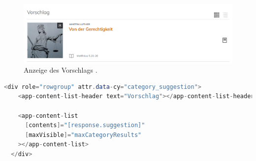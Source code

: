 \begin{figure}[h]
  \begin{centering}
    \includegraphics[width=\textwidth]{figures/development/suggestion.png}
    \caption{Anzeige des Vorschlags \cite{pfleiderer2022}.}
    \label{fig:suggestion}
  \end{centering}
\end{figure}


\begin{lstlisting}[language=Java, label=code:suggestionRow, title={Code für Anzeige des Vorschlage \cite{frontend2022}}]
  <div role="rowgroup" attr.data-cy="category_suggestion">
    <app-content-list-header text="Vorschlag"></app-content-list-header>

    <app-content-list
      [contents]="[response.suggestion]"
      [maxVisible]="maxCategoryResults"
    ></app-content-list>
  </div>
\end{lstlisting}
